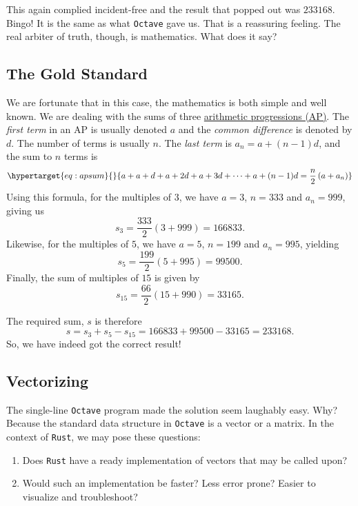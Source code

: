 \documentclass[
  a4paper,
]{article}
\begin{document}
This again complied incident-free and the result that popped out was
\(233168\). Bingo! It is the same as what \texttt{Octave} gave us. That
is a reassuring feeling. The real arbiter of truth, though, is
mathematics. What does it say?

\hypertarget{the-gold-standard}{%
\subsection{The Gold Standard}\label{the-gold-standard}}

We are fortunate that in this case, the mathematics is both simple and
well known. We are dealing with the sums of three
\href{https://en.wikipedia.org/wiki/Arithmetic_progression\#Sum}{arithmetic
progressions (AP)}. The \emph{first term} in an AP is usually denoted
\(a\) and the \emph{common difference} is denoted by \(d\). The number
of terms is usually \(n\). The \emph{last term} is
\(a_n = a + (n - 1)d\), and the sum to \(n\) terms is
\begin{equation}\protect\hypertarget{eq:apsum}{}{
a + a + d + a + 2d + a + 3d + \cdots + a + (n - 1)d = \frac{n}{2}\left( a + a_n \right)
}\label{eq:apsum}\end{equation} Using this formula, for the multiples of
\(3\), we have \(a = 3\), \(n = 333\) and \(a_n=999\), giving us \[
s_3 = \frac{333}{2}\left( 3 + 999\right) = 166833.
\] Likewise, for the multiples of \(5\), we have \(a = 5\), \(n = 199\)
and \(a_n = 995\), yielding \[
s_5 = \frac{199}{2}\left( 5 + 995\right) = 99500.
\] Finally, the sum of multiples of \(15\) is given by \[
s_{15} = \frac{66}{2}\left( 15 + 990\right) = 33165.
\]

The required sum, \(s\) is therefore \[
s= s_3 + s_5 - s_{15} = 166833 + 99500 -33165 = 233168.
\] So, we have indeed got the correct result!

\hypertarget{vectorizing}{%
\subsection{Vectorizing}\label{vectorizing}}

The single-line \texttt{Octave} program made the solution seem laughably
easy. Why? Because the standard data structure in \texttt{Octave} is a
vector or a matrix. In the context of \texttt{Rust}, we may pose these
questions:

\begin{enumerate}
\item
  Does \texttt{Rust} have a ready implementation of vectors that may be
  called upon?
\item
  Would such an implementation be faster? Less error prone? Easier to
  visualize and troubleshoot?
\end{enumerate}
\end{document}
